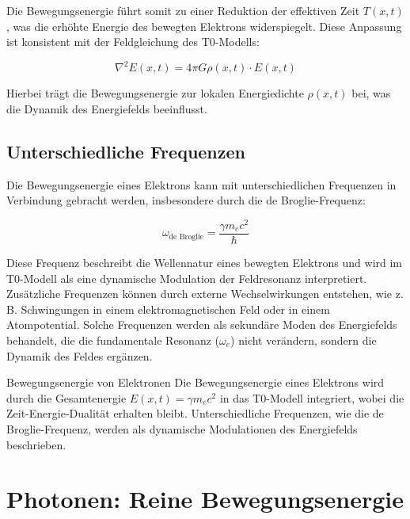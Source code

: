 \documentclass[12pt,a4paper]{article}
\begin{document}
	Die Bewegungsenergie führt somit zu einer Reduktion der effektiven Zeit \( T(x,t) \), was die erhöhte Energie des bewegten Elektrons widerspiegelt. Diese Anpassung ist konsistent mit der Feldgleichung des T0-Modells:
	
	\begin{equation}
		\nabla^2 E(x,t) = 4\pi G \rho(x,t) \cdot E(x,t)
		\label{eq:energy_field_equation}
	\end{equation}
	
	Hierbei trägt die Bewegungsenergie zur lokalen Energiedichte \(\rho(x,t)\) bei, was die Dynamik des Energiefelds beeinflusst.
	
	\subsection{Unterschiedliche Frequenzen}
	\label{subsec:electron_frequencies}
	
	Die Bewegungsenergie eines Elektrons kann mit unterschiedlichen Frequenzen in Verbindung gebracht werden, insbesondere durch die de Broglie-Frequenz:
	
	\begin{equation}
		\omega_{\text{de Broglie}} = \frac{\gamma m_e c^2}{\hbar}
	\end{equation}
	
	Diese Frequenz beschreibt die Wellennatur eines bewegten Elektrons und wird im T0-Modell als eine dynamische Modulation der Feldresonanz interpretiert. Zusätzliche Frequenzen können durch externe Wechselwirkungen entstehen, wie z. B. Schwingungen in einem elektromagnetischen Feld oder in einem Atompotential. Solche Frequenzen werden als sekundäre Moden des Energiefelds behandelt, die die fundamentale Resonanz (\(\omega_e\)) nicht verändern, sondern die Dynamik des Feldes ergänzen.
	
	\begin{important}{Bewegungsenergie von Elektronen}{}
		Die Bewegungsenergie eines Elektrons wird durch die Gesamtenergie \( E(x,t) = \gamma m_e c^2 \) in das T0-Modell integriert, wobei die Zeit-Energie-Dualität erhalten bleibt. Unterschiedliche Frequenzen, wie die de Broglie-Frequenz, werden als dynamische Modulationen des Energiefelds beschrieben.
	\end{important}
	
	\section{Photonen: Reine Bewegungsenergie}
	\label{sec:photon_energy}
	
\end{document}
